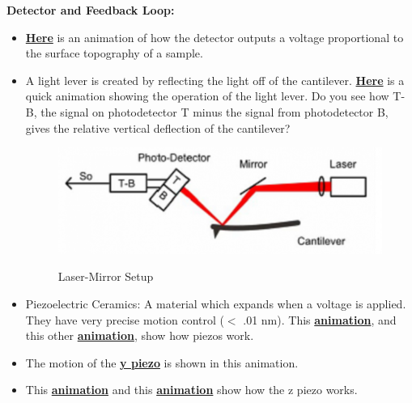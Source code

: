\documentclass{../lab}
\begin{document}
\textbf{Detector and Feedback Loop:}

\begin{itemize}
    \item \href{http://experimentationlab.berkeley.edu/sites/default/files/AFMImages/2.1.\%20photodetector.flv\_converted.mp4}{\textbf{Here}} is an animation of how the detector outputs a voltage proportional to the surface topography of a sample.

    \item A light lever is created by reflecting the light off of the cantilever.  \href{http://experimentationlab.berkeley.edu/sites/default/files/AFMImages/2.3.\%20Light\%20Lever.flv\_converted.mp4}{\textbf{Here}} is a quick animation showing the operation of the light lever. Do you see how T-B, the signal on photodetector T minus the signal from photodetector B, gives the relative vertical deflection of the cantilever?
    \begin{figure}[h]
        \centering
        \href{http://experimentationlab.berkeley.edu/sites/default/files/AFMImages/AFMlasermirror.png}{\includegraphics[width=0.5\linewidth]{images/AFMlasermirror.png}}
        \caption{Laser-Mirror Setup}
        \label{fig:AFMlasermirror}
    \end{figure}

    \item Piezoelectric Ceramics:  A material which expands when a voltage is applied.  They have very precise motion control ($<$ .01 nm).  This \href{http://experimentationlab.berkeley.edu/sites/default/files/AFMImages/3.1.\%20Motion.flv\_converted.mp4}{\textbf{animation}}, and this other \href{http://experimentationlab.berkeley.edu/sites/default/files/AFMImages/3.2.\%20proportional.flv\_converted.mp4}{\textbf{animation}}, show how piezos work.

    \item The motion of the \href{http://experimentationlab.berkeley.edu/sites/default/files/AFMImages/3.3.\%20Y\%20Scanner\_converted.mp4}{\textbf{y piezo}} is shown in this animation.

    \item This \href{http://experimentationlab.berkeley.edu/sites/default/files/AFMImages/3.4.\%20Z\%20Scanner.flv\_converted.mp4}{\textbf{animation}} and this\textbf{ }\href{http://experimentationlab.berkeley.edu/sites/default/files/AFMImages/4.1.\%20Z\%20motion.flv\_converted.mp4}{\textbf{animation}} show how the z piezo works.


\end{itemize}
\end{document}
